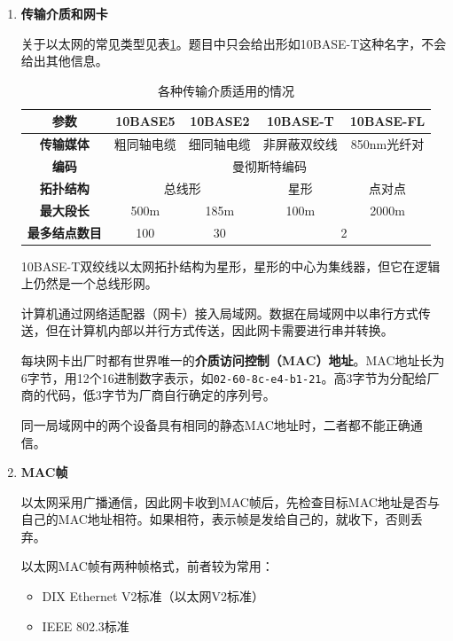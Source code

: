 \documentclass[12pt, a4paper, oneside]{ctexart}
\begin{document}
\begin{enumerate}
    \item {\bf 传输介质和网卡}
    
    关于以太网的常见类型见表\ref{ethernet}。题目中只会给出形如10BASE-T这种名字，不会给出其他信息。

    \begin{table}
        \centering
        \caption{各种传输介质适用的情况}
        \label{ethernet}
        \begin{tabular}{|c|c|c|c|c|}
            \hline
            \textbf{参数} & \textbf{10BASE5} & \textbf{10BASE2} & \textbf{10BASE-T} & \textbf{10BASE-FL} \\
            \hline
            \textbf{传输媒体} & 粗同轴电缆 & 细同轴电缆 & 非屏蔽双绞线 & 850nm光纤对 \\
            \hline
            \textbf{编码} & \multicolumn{4}{|c|}{曼彻斯特编码} \\
            \hline
            \textbf{拓扑结构} & \multicolumn{2}{|c|}{总线形} & 星形 & 点对点 \\
            \hline
            \textbf{最大段长} & 500m & 185m & 100m & 2000m \\
            \hline
            \textbf{最多结点数目} & 100 & 30 & \multicolumn{2}{|c|}{2} \\
            \hline
        \end{tabular}
    \end{table}

    10BASE-T双绞线以太网拓扑结构为星形，星形的中心为集线器，但它在逻辑上仍然是一个总线形网。

    计算机通过网络适配器（网卡）接入局域网。数据在局域网中以串行方式传送，但在计算机内部以并行方式传送，因此网卡需要进行串并转换。

    每块网卡出厂时都有世界唯一的\textbf{介质访问控制（MAC）地址}。MAC地址长为6字节，用12个16进制数字表示，如\verb|02-60-8c-e4-b1-21|。高3字节为分配给厂商的代码，低3字节为厂商自行确定的序列号。

    同一局域网中的两个设备具有相同的静态MAC地址时，二者都不能正确通信。

    \item {\bf MAC帧}
    
    以太网采用广播通信，因此网卡收到MAC帧后，先检查目标MAC地址是否与自己的MAC地址相符。如果相符，表示帧是发给自己的，就收下，否则丢弃。

    以太网MAC帧有两种帧格式，前者较为常用：
    \begin{itemize}
        \item DIX Ethernet V2标准（以太网V2标准）
        \item IEEE 802.3标准
    \end{itemize}


\end{enumerate}
\end{document}
